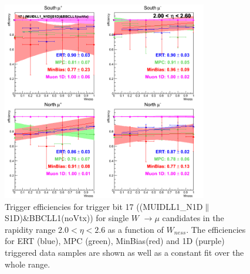 \begin{figure}[h!]

  \centering

  \includegraphics[width=0.8\textwidth]{./figures/run13_trigeffisn_eta2_trig17_lin.png}
  \caption{\label{fig:run13_trigeffisn_eta2_nper0_trig17_lin} Trigger efficiencies for trigger bit 17 ((MUIDLL1\_N1D$\|$S1D)\&BBCLL1(noVtx)) for single $W$ $\rightarrow \mu$ candidates in the rapidity range $ 2.0 < \eta < 2.6$ as a function of $W_{ness}$. The efficiencies for ERT (blue), MPC (green), MinBias(red) and 1D (purple) triggered data samples are shown as well as a constant fit over the whole range.}

\end{figure}
\clearpage
